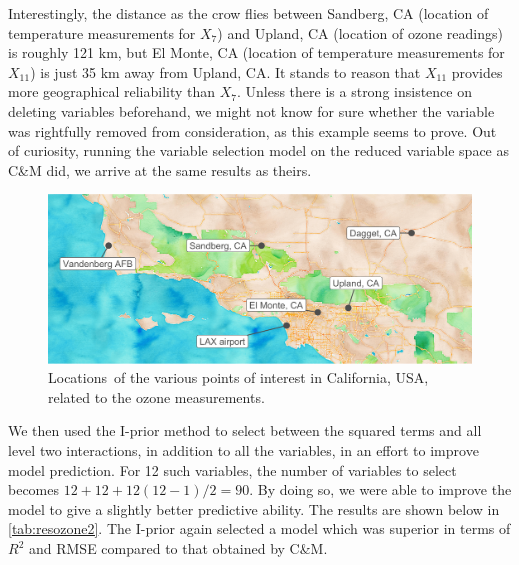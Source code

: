 \documentclass[showframe,11pt,twoside,openright]{report}
\begin{document}
Interestingly, the distance as the crow flies between Sandberg, CA (location of temperature measurements for $X_7$) and Upland, CA (location of ozone readings) is roughly 121 km, but El Monte, CA (location of temperature measurements for $X_{11}$) is just 35 km away from Upland, CA.
It stands to reason that $X_{11}$ provides more geographical reliability than $X_7$.
Unless there is a strong insistence on deleting variables beforehand, we might not know for sure whether the variable was rightfully removed from consideration, as this example seems to prove.
Out of curiosity, running the variable selection model on the reduced variable space as C\&M did, we arrive at the same results as theirs.

\begin{figure}[htb]
  \centering
  \vspace{6pt}
  \includegraphics[width=\textwidth]{figure/06-ozone_map}
  \caption[Locations of the various points of interest in California, USA, related to the ozone measurements]{Locations\footnotemark~of the various points of interest in California, USA, related to the ozone measurements.}
  \label{fig:aerobic-densplot       }
\end{figure}


We then used the I-prior method to select between the squared terms and all level two interactions, in addition to all the variables, in an effort to improve model prediction. 
For 12 such variables, the number of variables to select becomes $12 + 12 + 12(12 - 1)/2 = 90$. 
By doing so, we were able to improve the model to give a slightly better predictive ability.
The results are shown below in \cref{tab:resozone2}. 
The I-prior again selected a model which was superior in terms of $R^2$ and RMSE compared to that obtained by C\&M.
\end{document}
